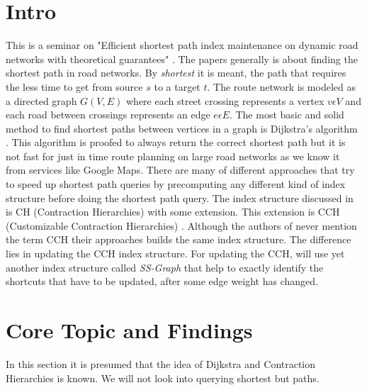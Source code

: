 \documentclass[twocolumn]{article}
\begin{document}


\section{Intro}

This is a seminar on "Efficient shortest path index maintenance on dynamic
road networks with theoretical guarantees" \cite{Ouyang2020}. The papers generally is
about finding the shortest path in road networks. By \textit{shortest} it is meant,
the path that requires the less time to get from source $s$ to a target $t$. The route
network is modeled as a directed graph $G(V,E)$ where each street crossing represents a
vertex $v \epsilon V$ and each road between crossings represents an edge $e \epsilon E$.
The most basic and solid method to find shortest paths between vertices in a graph is
Dijkstra's algorithm \cite{Dijkstra1959}. This algorithm is proofed to always return the
correct shortest path but it is not fast for just in time route planning on large
road networks as we know it from services like Google Maps. There are many of
different approaches that try to speed up shortest path queries by precomputing 
any different kind of index structure before doing the shortest path query. The index 
structure discussed in \cite{Ouyang2020} is CH (Contraction Hierarchies)\cite{Geisberger}
with some extension. This extension is CCH (Customizable Contraction Hierarchies) 
\cite{Dibbelt2014}. Although the authors of \cite{Ouyang2020} never mention the term
CCH their approaches builds the same index structure. The difference lies in updating 
the CCH index structure. For updating the CCH, \cite{Ouyang2020} will use yet another
index structure called \textit{SS-Graph} that help to exactly identify the shortcuts that
have to be updated, after some edge weight has changed.

\section{Core Topic and Findings}

In this section it is presumed that the idea of Dijkstra \cite{Dijkstra1959} and 
Contraction Hierarchies \cite{Geisberger} is known. We will not look into querying 
shortest but paths. 

\newpage


\end{document}
